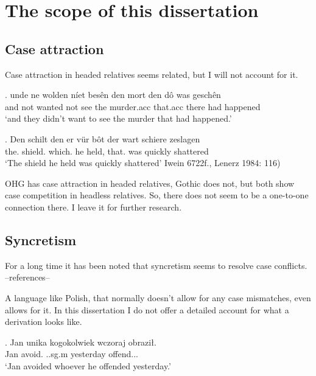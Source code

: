 \section{The scope of this dissertation}

\subsection{Case attraction}\label{sec:attraction}

Case attraction in headed relatives seems related, but I will not account for it.

\exg. unde ne wolden níet besên den mort den dô was geschên\\
 and not wanted not see the murder.\ac{acc} that.\ac{acc} there had happened\\
 `and they didn't want to see the murder that had happened.' 

 \exg. Den schilt den er {vür bôt} der wart schiere zeslagen\\
 the. shield. which. he held, that. was quickly shattered\\
 `The shield he held was quickly shattered' \label{ex:iaheaded}\hfill Iwein 6722f., Lenerz 1984: 116)

OHG has case attraction in headed relatives, Gothic does not, but both show case competition in headless relatives. So, there does not seem to be a one-to-one connection there. I leave it for further research.

\subsection{Syncretism}

For a long time it has been noted that syncretism seems to resolve case conflicts. --references--

A language like Polish, that normally doesn't allow for any case mismatches, even allows for it. In this dissertation I do not offer a detailed account for what a derivation looks like.

\exg. Jan unika kogokolwiek wczoraj obraził.\\
Jan avoid.\scsub{[gen]} ..\ac{sg}.\ac{m} yesterday offend..\scsub{[acc]}.\\
`Jan avoided whoever he offended yesterday.'

